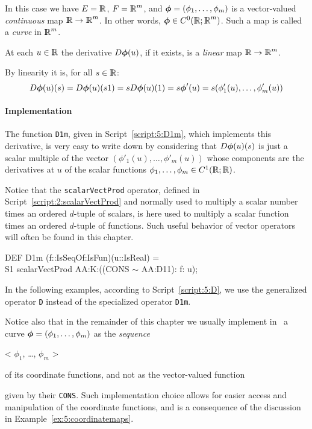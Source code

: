 \documentclass{31x47jw}
\begin{document}
In this case we have $E = \mathbb{I\!\!R}$, $F = \mathbb{I\!\!R}^{m}$, and
${\mbox{\boldmath $\phi$}}=(\phi_{1},\ldots,\phi_{m})$ is a vector-valued
\emph{continuous} map $\mathbb{I\!\!R} \rightarrow \mathbb{I\!\!R}^{m}$.  In other words,
${\mbox{\boldmath $\phi$}} \in C^{0}(\mathbb{I\!\!R};\mathbb{I\!\!R}^{m})$.  Such a map is called a
\emph{curve} in $\mathbb{I\!\!R}^{m}$.

At each $u\in\mathbb{I\!\!R}$ the derivative $D{\mbox{\boldmath $\phi$}}(u)$, if it exists, is a
\emph{linear} map $\mathbb{I\!\!R} \rightarrow \mathbb{I\!\!R}^{m}$.

By linearity it is, for all $s\in\mathbb{I\!\!R}$:
\[
D{\mbox{\boldmath $\phi$}}(u)(s) = D{\mbox{\boldmath $\phi$}}(u) (s 1) = s D{\mbox{\boldmath $\phi$}}(u)(1) = s {\mbox{\boldmath $\phi$}}'(u) = s
(\phi'_{1}(u), \ldots, \phi'_{m}(u))
\]

\paragraph{Implementation}

The function \texttt{D1m}, given in Script~\ref{script:5:D1m}, which
implements this derivative, is very easy to write down by considering
that $D{\mbox{\boldmath $\phi$}}(u)(s)$ is just a scalar multiple of the vector
$(\phi'_{1}(u), \ldots, \phi'_{m}(u))$ whose components are the
derivatives at $u$ of the scalar functions $\phi_{1},\ldots,
\phi_{m}\in C^{1}(\mathbb{I\!\!R};\mathbb{I\!\!R})$.  

Notice that the \texttt{scalarVectProd} operator, defined in
Script~\ref{script:2:scalarVectProd} and normally used to multiply a
scalar number times an ordered $d$-tuple of scalars, is here used to
multiply a scalar function times an ordered $d$-tuple of functions. 
Such useful behavior of vector operators will often be found in this
chapter.

\begin{script}
\begin{smallplasm} 
DEF D1m (f::IsSeqOf:IsFun)(u::IsReal) = \+\\
  S1 scalarVectProd AA:K:((CONS $\sim$ AA:D11): f: u);
\end{smallplasm} 
\label{script:5:D1m}
\end{script}

In the following examples, according to Script~\ref{script:5:D}, we use the
generalized operator \texttt{D} instead of the specialized operator
\texttt{D1m}.

Notice also that in the remainder of this chapter we usually implement
 in \pl\ a curve
${\mbox{\boldmath $\phi$}} = (\phi_{1}, \ldots, \phi_{m})$ as the \emph{sequence} 
\begin{smallplasm}
< $\phi_{1}$, \ldots, $\phi_{m}$ >
\end{smallplasm}
of its coordinate functions, and not as the
vector-valued function 
\begin{smallplasm}
\end{smallplasm}
given by their \texttt{CONS}.  Such implementation choice allows for
easier access and manipulation of the coordinate functions, and is a
consequence of the discussion in Example~\ref{ex:5:coordinatemaps}.
\end{document}

